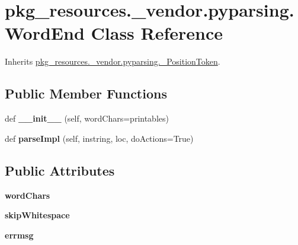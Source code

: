 \hypertarget{classpkg__resources_1_1__vendor_1_1pyparsing_1_1_word_end}{}\section{pkg\+\_\+resources.\+\_\+vendor.\+pyparsing.\+Word\+End Class Reference}
\label{classpkg__resources_1_1__vendor_1_1pyparsing_1_1_word_end}


Inherits \hyperlink{classpkg__resources_1_1__vendor_1_1pyparsing_1_1___position_token}{pkg\+\_\+resources.\+\_\+vendor.\+pyparsing.\+\_\+\+Position\+Token}.

\subsection*{Public Member Functions}
\begin{DoxyCompactItemize}
\item 
\mbox{\label{classpkg__resources_1_1__vendor_1_1pyparsing_1_1_word_end_a61b04aa7ea3458523c747fb3e3b5789b}} 
def {\bfseries \+\_\+\+\_\+init\+\_\+\+\_\+} (self, word\+Chars=printables)
\item 
\mbox{\label{classpkg__resources_1_1__vendor_1_1pyparsing_1_1_word_end_a8fa96ea9d8026ecc9dae92e526d629d8}} 
def {\bfseries parse\+Impl} (self, instring, loc, do\+Actions=True)
\end{DoxyCompactItemize}
\subsection*{Public Attributes}
\begin{DoxyCompactItemize}
\item 
\mbox{\label{classpkg__resources_1_1__vendor_1_1pyparsing_1_1_word_end_aae7adb6c9f28333a4a02177c02982f0b}} 
{\bfseries word\+Chars}
\item 
\mbox{\label{classpkg__resources_1_1__vendor_1_1pyparsing_1_1_word_end_a280f4f5fb0fe0ffbfb264ec1064dab2c}} 
{\bfseries skip\+Whitespace}
\item 
\mbox{\label{classpkg__resources_1_1__vendor_1_1pyparsing_1_1_word_end_a7b5e89c9b3d36ca95461b35908c7a414}} 
{\bfseries errmsg}
\end{DoxyCompactItemize}
